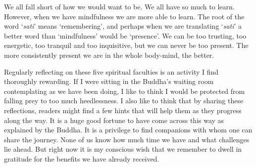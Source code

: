We all fall short of how we would want to be. We all have so much to
learn. However, when we have mindfulness we are more able to learn. The
root of the word `\emph{sati}' means `remembering', and perhaps when we
are translating `\emph{sati}' a better word than `mindfulness' would be
`presence'. We can be too trusting, too energetic, too tranquil and too
inquisitive, but we can never be too present. The more consistently
present we are in the whole body-mind, the better.

Regularly reflecting on these five spiritual faculties is an activity I
find thoroughly rewarding. If I were sitting in the Buddha's waiting
room contemplating as we have been doing, I like to think I would be
protected from falling prey to too much heedlessness. I also like to
think that by sharing these reflections, readers might find a few hints
that will help them as they progress along the way. It is a huge good
fortune to have come across this way as explained by the Buddha. It is a
privilege to find companions with whom one can share the journey. None
of us know how much time we have and what challenges lie ahead. But
right now it is my conscious wish that we remember to dwell in gratitude
for the benefits we have already received.

